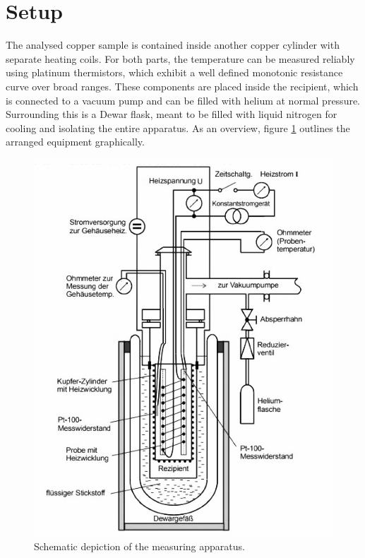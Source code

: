 \section{Setup}
\label{sec:setup}

The analysed copper sample is contained inside another copper cylinder with separate heating coils. For both parts, the
temperature can be measured reliably using platinum thermistors, which exhibit a well defined monotonic resistance curve over
broad ranges. These components are placed inside the recipient, which is connected to a vacuum pump and can be filled with
helium at normal pressure. Surrounding this is a Dewar flask, meant to be filled with liquid nitrogen for cooling and isolating
the entire apparatus. As an overview, figure \ref{fig:equipment} outlines the arranged equipment graphically.

\begin{figure}[H]
	\centering
	\includegraphics[width=0.45\linewidth]{content/graphics/equipment.jpg}
	\caption{Schematic depiction of the measuring apparatus. \cite{molar_heat}}
	\label{fig:equipment}
\end{figure}
